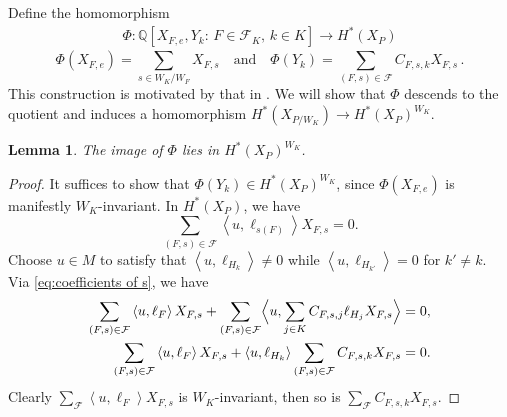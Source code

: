 \documentclass{amsart}
\theoremstyle{plain} \numberwithin{equation}{section}
\newtheorem{lemma}[theorem]{Lemma}
\theoremstyle{definition}
\newcommand{\Q}{\mathbb{Q}}
\newcommand{\ip}[1]{\left\langle #1 \right\rangle}
\begin{document}
Define the homomorphism
\begin{align}
  \Phi: \Q[X_{F,e}, Y_k: \, F\in\mathcal{F}_K,\, k\in K] \longrightarrow H^*(X_{P})\label{eq:topmap}
\end{align}
$$
  \Phi(X_{F,e})=\sum_{s\in{W_K}/{W_F}}X_{F,s}\quad\text{and}\quad \Phi(Y_{k})=\sum_{(F,s)\in\mathcal{F}} C_{F,s,k}X_{F,s}\, .
$$
This construction is motivated by that in \cite[Equation (5.3)]{horiguchiToricOrbifoldsAssociated2024}. We will show that $\Phi$ descends to the quotient and induces a homomorphism
$H^*(X_{P/W_K}) \to H^*(X_P)^{W_K}$.

\begin{lemma}
  The image of $\Phi$ lies in $H^*(X_{P})^{W_K}$.
\end{lemma}
\begin{proof}
  It suffices to show that $\Phi(Y_k)\in H^*(X_P)^{W_K}$, since $\Phi(X_{F,e})$ is manifestly $W_K$-invariant.
  In $H^*(X_{P})$, we have 
  $$
  \sum_{(F,s)\in\mathcal{F}}\ip{u,\ell_{s(F)}}X_{F,s}=0.
  $$
  Choose $u\in M$ to satisfy that $\ip{u,\ell_{H_k}}\ne 0$ while $\ip{u,\ell_{H_{k'}}}=0$ for $k'\ne k$. Via \cref{eq:coefficients of s}, we have 
  \begin{align*}
    \sum_{(F,s)\in\mathcal{F}}\ip{u,\ell_{F}}X_{F,s}+\sum_{(F,s)\in\mathcal{F}}\Bigl\langle {u,\sum_{j\in K} C_{F,s,j}\ell_{H_j}}X_{F,s}\Bigr\rangle&=0,\\
    \sum_{(F,s)\in\mathcal{F}}\ip{u,\ell_{F}}X_{F,s}+\ip{u,\ell_{H_k}}\sum_{(F,s)\in\mathcal{F}}C_{F,s,k}X_{F,s}&=0.
  \end{align*}
  Clearly $\sum_{\mathcal{F}}\ip{u,\ell_{F}}X_{F,s}$ is $W_K$-invariant, then so is $\sum_{\mathcal{F}}C_{F,s,k}X_{F,s}$.  
  \qedhere
\end{proof}
\end{document}
